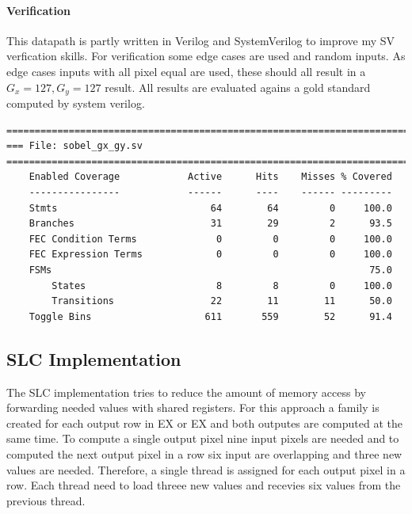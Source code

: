 \documentclass[a4paper,fontsize=12pt]{scrartcl}
\begin{document}
\paragraph{Verification}

This datapath is partly written in Verilog and SystemVerilog to improve my SV verfication skills. For verification some edge cases are used and random inputs. As edge cases inputs with all pixel equal are used, these should all result in a $G_x = 127, G_y = 127$ result. All results are evaluated agains a gold standard computed by system verilog.

\pagebreak

\begin{lstlisting}
=================================================================================
=== File: sobel_gx_gy.sv
=================================================================================
    Enabled Coverage            Active      Hits    Misses % Covered
    ----------------            ------      ----    ------ ---------
    Stmts                           64        64         0     100.0
    Branches                        31        29         2      93.5
    FEC Condition Terms              0         0         0     100.0
    FEC Expression Terms             0         0         0     100.0
    FSMs                                                        75.0
        States                       8         8         0     100.0
        Transitions                 22        11        11      50.0
    Toggle Bins                    611       559        52      91.4
\end{lstlisting}

\subsection{SLC Implementation}
The SLC implementation tries to reduce the amount of memory access by forwarding needed values with shared registers. For this approach a family is created for each output row in EX or EX and both outputes are computed at the same time. To compute a single output pixel nine input pixels are needed and to computed the next output pixel in a row six input are overlapping and three new values are needed. Therefore, a single thread is assigned for each output pixel in a row. Each thread need to load threee new values and recevies six values from the previous thread.
\end{document}
